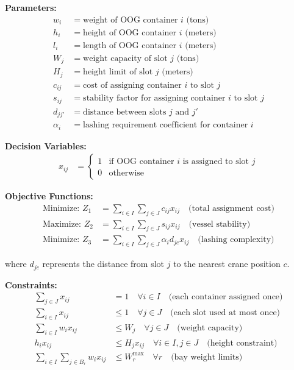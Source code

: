 \documentclass{article}
\begin{document}
\textbf{Parameters:}
\begin{align}
w_i &= \text{weight of OOG container } i \text{ (tons)} \\
h_i &= \text{height of OOG container } i \text{ (meters)} \\
l_i &= \text{length of OOG container } i \text{ (meters)} \\
W_j &= \text{weight capacity of slot } j \text{ (tons)} \\
H_j &= \text{height limit of slot } j \text{ (meters)} \\
c_{ij} &= \text{cost of assigning container } i \text{ to slot } j \\
s_{ij} &= \text{stability factor for assigning container } i \text{ to slot } j \\
d_{jj'} &= \text{distance between slots } j \text{ and } j' \\
\alpha_{i} &= \text{lashing requirement coefficient for container } i
\end{align}

\textbf{Decision Variables:}
\begin{align}
x_{ij} &= \begin{cases} 
1 & \text{if OOG container } i \text{ is assigned to slot } j \\
0 & \text{otherwise}
\end{cases}
\end{align}

\textbf{Objective Functions:}
\begin{align}
\text{Minimize: } Z_1 &= \sum_{i \in I} \sum_{j \in J} c_{ij} x_{ij} \quad \text{(total assignment cost)} \\
\text{Maximize: } Z_2 &= \sum_{i \in I} \sum_{j \in J} s_{ij} x_{ij} \quad \text{(vessel stability)} \\
\text{Minimize: } Z_3 &= \sum_{i \in I} \sum_{j \in J} \alpha_i d_{jc} x_{ij} \quad \text{(lashing complexity)}
\end{align}

where \(d_{jc}\) represents the distance from slot \(j\) to the nearest crane position \(c\).

\textbf{Constraints:}
\begin{align}
\sum_{j \in J} x_{ij} &= 1 \quad \forall i \in I \quad \text{(each container assigned once)} \\
\sum_{i \in I} x_{ij} &\leq 1 \quad \forall j \in J \quad \text{(each slot used at most once)} \\
\sum_{i \in I} w_i x_{ij} &\leq W_j \quad \forall j \in J \quad \text{(weight capacity)} \\
h_i x_{ij} &\leq H_j x_{ij} \quad \forall i \in I, j \in J \quad \text{(height constraint)} \\
\sum_{i \in I} \sum_{j \in B_r} w_i x_{ij} &\leq W_r^{\max} \quad \forall r \quad \text{(bay weight limits)}
\end{align}
\end{document}
